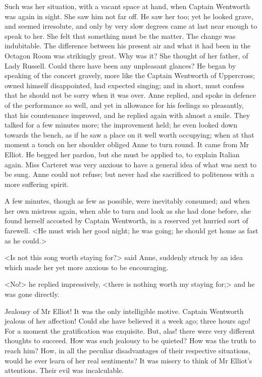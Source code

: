 Such was her situation, with a vacant space at hand, when Captain Wentworth was again in sight. She saw him not far off. He saw her too; yet he looked grave, and seemed irresolute, and only by very slow degrees came at last near enough to speak to her. She felt that something must be the matter. The change was indubitable. The difference between his present air and what it had been in the Octagon Room was strikingly great. Why was it? She thought of her father, of Lady Russell. Could there have been any unpleasant glances? He began by speaking of the concert gravely, more like the Captain Wentworth of Uppercross; owned himself disappointed, had expected singing; and in short, must confess that he should not be sorry when it was over. Anne replied, and spoke in defence of the performance so well, and yet in allowance for his feelings so pleasantly, that his countenance improved, and he replied again with almost a smile. They talked for a few minutes more; the improvement held; he even looked down towards the bench, as if he saw a place on it well worth occupying; when at that moment a touch on her shoulder obliged Anne to turn round. It came from Mr Elliot. He begged her pardon, but she must be applied to, to explain Italian again. Miss Carteret was very anxious to have a general idea of what was next to be sung. Anne could not refuse; but never had she sacrificed to politeness with a more suffering spirit.

A few minutes, though as few as possible, were inevitably consumed; and when her own mistress again, when able to turn and look as she had done before, she found herself accosted by Captain Wentworth, in a reserved yet hurried sort of farewell. <He must wish her good night; he was going; he should get home as fast as he could.>

<Is not this song worth staying for?> said Anne, suddenly struck by an idea which made her yet more anxious to be encouraging.

<No!> he replied impressively, <there is nothing worth my staying for;> and he was gone directly.

Jealousy of Mr Elliot! It was the only intelligible motive. Captain Wentworth jealous of her affection! Could she have believed it a week ago; three hours ago! For a moment the gratification was exquisite. But, alas! there were very different thoughts to succeed. How was such jealousy to be quieted? How was the truth to reach him? How, in all the peculiar disadvantages of their respective situations, would he ever learn of her real sentiments? It was misery to think of Mr Elliot's attentions. Their evil was incalculable.